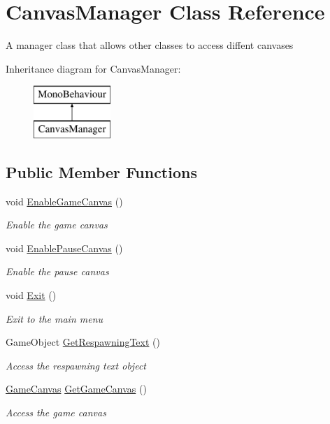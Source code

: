 \hypertarget{class_canvas_manager}{}\section{Canvas\+Manager Class Reference}
\label{class_canvas_manager}


A manager class that allows other classes to access diffent canvases  


Inheritance diagram for Canvas\+Manager\+:\begin{figure}[H]
\begin{center}
\leavevmode
\includegraphics[height=2.000000cm]{class_canvas_manager}
\end{center}
\end{figure}
\subsection*{Public Member Functions}
\begin{DoxyCompactItemize}
\item 
void \mbox{\hyperlink{class_canvas_manager_ae9d3e7181eaefcfe96a7c00772d85f69}{Enable\+Game\+Canvas}} ()
\begin{DoxyCompactList}\small\item\em Enable the game canvas \end{DoxyCompactList}\item 
void \mbox{\hyperlink{class_canvas_manager_a4b45b461a40a6642cbb6ff47b6c13cf5}{Enable\+Pause\+Canvas}} ()
\begin{DoxyCompactList}\small\item\em Enable the pause canvas \end{DoxyCompactList}\item 
void \mbox{\hyperlink{class_canvas_manager_afade6015b931715904f021bc554b65fd}{Exit}} ()
\begin{DoxyCompactList}\small\item\em Exit to the main menu \end{DoxyCompactList}\item 
Game\+Object \mbox{\hyperlink{class_canvas_manager_a029e8183db87b6aa06be208735aff5c6}{Get\+Respawning\+Text}} ()
\begin{DoxyCompactList}\small\item\em Access the respawning text object \end{DoxyCompactList}\item 
\mbox{\hyperlink{class_game_canvas}{Game\+Canvas}} \mbox{\hyperlink{class_canvas_manager_a4ca7162730ba189ec52a772fda4f9a3c}{Get\+Game\+Canvas}} ()
\begin{DoxyCompactList}\small\item\em Access the game canvas \end{DoxyCompactList}\end{DoxyCompactItemize}



